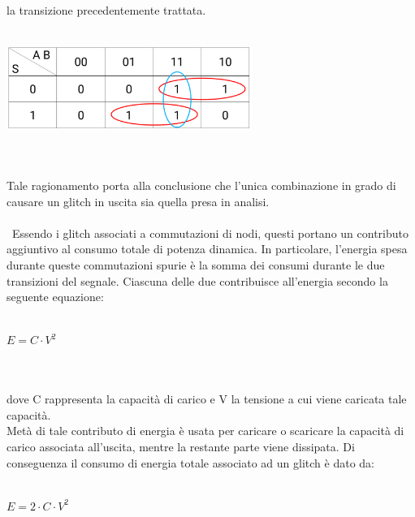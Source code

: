 \documentclass[11pt,  english, makeidx, a4paper, titlepage, oneside]{book}
\begin{document}
la transizione precedentemente trattata. 
\\\\
\centerline{\includegraphics[width=8cm]{./img/Lab_1/Es_4/Mappa_K_supercoperta.png}}
\\\\
Tale ragionamento porta alla conclusione che l'unica combinazione in grado
di causare un glitch in uscita sia quella presa in analisi.
\\\\\
Essendo i glitch associati a commutazioni di nodi, questi portano un 
contributo aggiuntivo al consumo totale di potenza dinamica. In particolare,
l'energia spesa durante queste commutazioni spurie è la somma dei consumi
durante le due transizioni del segnale. Ciascuna delle due contribuisce all'energia secondo la seguente equazione:
\\\\
\centerline{$E = C \cdot V^{2}$}
\\\\
dove C rappresenta la capacità di carico e V la tensione a cui viene caricata
tale capacità.
\\
Metà di tale contributo di energia è usata per caricare o scaricare la
capacità di carico associata all'uscita, mentre la restante parte viene
dissipata.
Di conseguenza il consumo di energia totale associato ad un glitch è 
dato da:
\\\\
\centerline{$E = 2 \cdot C \cdot V^{2}$}
\\\\
\newpage
\end{document}
